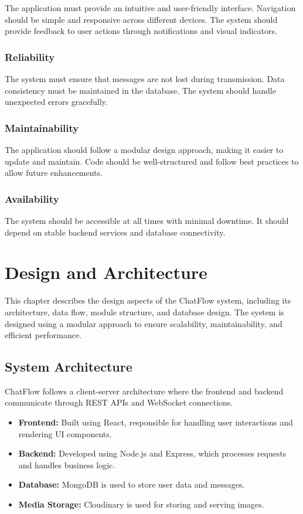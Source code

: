 \documentclass[12pt,a4paper]{report}
\begin{document}
The application must provide an intuitive and user-friendly interface. Navigation should be simple and responsive across different devices. The system should provide feedback to user actions through notifications and visual indicators.

\subsection{Reliability}

The system must ensure that messages are not lost during transmission. Data consistency must be maintained in the database. The system should handle unexpected errors gracefully.

\subsection{Maintainability}

The application should follow a modular design approach, making it easier to update and maintain. Code should be well-structured and follow best practices to allow future enhancements.

\subsection{Availability}

The system should be accessible at all times with minimal downtime. It should depend on stable backend services and database connectivity.

\chapter{Design and Architecture}

This chapter describes the design aspects of the ChatFlow system, including its architecture, data flow, module structure, and database design. The system is designed using a modular approach to ensure scalability, maintainability, and efficient performance.

\section{System Architecture}

ChatFlow follows a client-server architecture where the frontend and backend communicate through REST APIs and WebSocket connections.

\begin{itemize}
    \item \textbf{Frontend:} Built using React, responsible for handling user interactions and rendering UI components.
    \item \textbf{Backend:} Developed using Node.js and Express, which processes requests and handles business logic.
    \item \textbf{Database:} MongoDB is used to store user data and messages.
    \item \textbf{Media Storage:} Cloudinary is used for storing and serving images.
\end{itemize}
\end{document}
